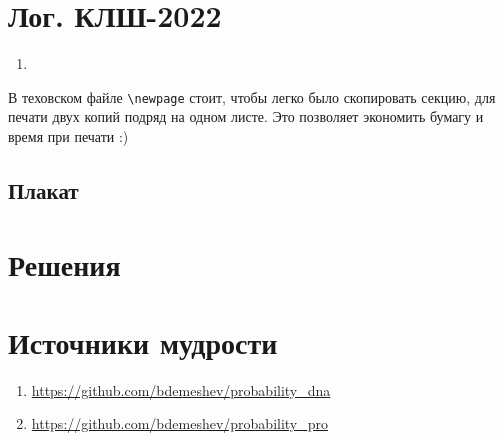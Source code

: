 \documentclass[12pt]{article}
\newcounter{problem}[section]
\theoremstyle{definition}
\begin{document}
\newpage

\section{Лог. КЛШ-2022}

\begin{enumerate}
  \item 
\end{enumerate}

В теховском файле \verb|\newpage| стоит, чтобы легко было скопировать секцию, для печати двух копий подряд на одном листе.
Это позволяет экономить бумагу и время при печати :)

\subsection{Плакат}






\renewenvironment{solution}[1]{%
         \vskip .5cm plus 2cm minus 0.1cm%
         {\bfseries \hyperlink{problem:#1}{#1.}}%
}%
{%
}%



\section{Решения}



\section{Источники мудрости}


\begin{enumerate}
\item \url{https://github.com/bdemeshev/probability_dna}
\item \url{https://github.com/bdemeshev/probability_pro}
\end{enumerate}

\printbibliography[heading=none]
\end{document}
